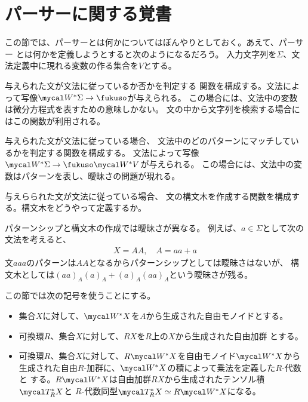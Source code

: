{\setlength\arraycolsep{2pt}
%
\section{パーサーに関する覚書}\label{s1:パーサーに関する覚書} %
	この節では、パーサーとは何かについてはぼんやりとしておく。あえて、パーサー
	とは何かを定義しようとすると次のようになるだろう。
	入力文字列を$\Sigma$、文法定義中に現れる変数の作る集合を$V$とする。
	\begin{description}\setlength{\itemsep}{-1mm} %
		\item[メンバーシップ] 与えられた文が文法に従っているか否かを判定する
		関数を構成する。文法によって写像$\W^*\Sigma\to\fukuso$が与えられる。
		この場合には、文法中の変数は微分方程式を表すための意味しかない。
		文の中から文字列を検索する場合にはこの関数が利用される。
		\item[パターンシップ] 与えられた文が文法に従っている場合、
		文法中のどのパターンにマッチしているかを判定する関数を構成する。
		文法によって写像$\W^*\Sigma\to\fukuso\W^*V$が与えられる。
		この場合には、文法中の変数はパターンを表し、曖昧さの問題が現れる。
		\item[構文木の作成] 与えらられた文が文法に従っている場合、
		文の構文木を作成する関数を構成する。構文木をどうやって定義するか。
	\end{description} %
	パターンシップと構文木の作成では曖昧さが異なる。
	例えば、$a\in\Sigma$として次の文法を考えると、
	\begin{equation*}\begin{split}
		X = AA,\quad A = aa + a
	\end{split}\end{equation*}
	文$aaa$のパターンは$AA$となるからパターンシップとしては曖昧さはないが、
	構文木としては$(aa)_A(a)_A+(a)_A(aa)_A$という曖昧さが残る。

	この節では次の記号を使うことにする。
	\begin{itemize}\setlength{\itemsep}{-1mm} %
		\item 集合$X$に対して、$\W^*X$を$A$から生成された自由モノイドとする。
		\item 可換環$R$、集合$X$に対して、$RX$を$R$上の$X$から生成された自由加群
		とする。
		\item 可換環$R$、集合$X$に対して、$R\W^*X$を自由モノイド$\W^*X$から
		生成された自由$R$-加群に、$\W^*X$の積によって乗法を定義した$R$-代数と
		する。$R\W^*X$は自由加群$RX$から生成されたテンソル積$\T_R^*X$と
		$R$-代数同型$\T_R^*X \simeq R\W^*X$になる。
	\end{itemize} %

}
